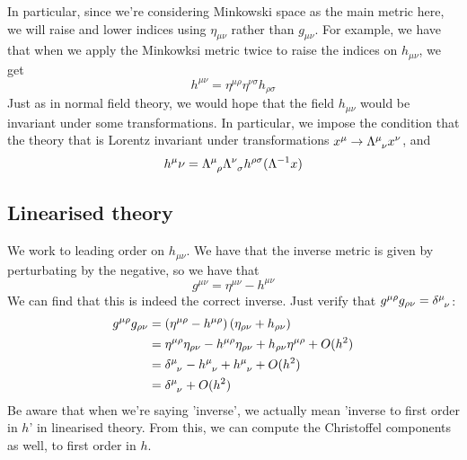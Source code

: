 In particular, since we're considering Minkowski space as
the main metric here, we will raise and lower indices 
using $\eta _{ \mu \nu }  $ rather than $ g _{ \mu \nu } $. 
For example, we have that when we apply the Minkowksi metric 
twice to raise the indices on $ h _{ \mu \nu } $, we get 
\[
h ^{ \mu \nu }  = \eta ^{ \mu \rho } \eta ^{ \nu \sigma  } h _{ \rho \sigma } 
\] 
Just as in normal field theory, we would hope 
that the field $ h _{ \mu \nu } $ would be invariant 
under some transformations. In particular, we 
impose the condition that the theory that is Lorentz invariant 
under transformations $ x ^ \mu \to \Lambda \indices{^ \mu _ \nu } x ^ \nu  $, 
and 
\[
h ^ \mu \nu  = \Lambda \indices{ ^ \mu _ \rho } \Lambda \indices{ ^ \nu _ \sigma } h^{ \rho \sigma }  ( \Lambda^{ -1  } x ) 
\]  

\subsection{Linearised theory} 
We work to leading order on $ h _{ \mu \nu } $. 
We have that the inverse metric is 
given by perturbating by the negative, so we have that 
\[
g ^{ \mu \nu } = \eta ^{ \mu \nu }  - h ^{ \mu\nu } 
\] We can find that this is indeed the 
correct inverse. Just verify that $ g^{ \mu \rho  } g_{ \rho \nu }  = \delta \indices{ ^ \mu _ \nu }  $: 
\begin{align*}
g^{ \mu \rho } g_{ \rho \nu } &=  \left( \eta ^{ \mu \rho }  - h ^{ \mu \rho }  \right)  \left( 
\eta _{ \rho \nu } + h _{ \rho \nu } \right)   \\ 
			      &=  \eta ^{ \mu \rho } \eta _{ \rho \nu }  - h ^{ \mu \rho } \eta _{ \rho \nu } + h _{ \rho \nu } \eta ^{ \mu \rho } + O ( h ^ 2 )  \\
			      &=  \delta \indices{ ^ \mu _ \nu }  - h \indices{ ^ \mu _ \nu } + h \indices{ ^ \mu _ \nu } + O ( h ^ 2 ) \\
			      &=  \delta \indices{ ^ \mu _ \nu } + O ( h ^ 2)  
\end{align*}
Be aware that when we're saying 'inverse', we actually 
mean 'inverse to first order in $ h $' in linearised theory.  
From this, we can compute the Christoffel components
as well, to first order in $ h$. 

